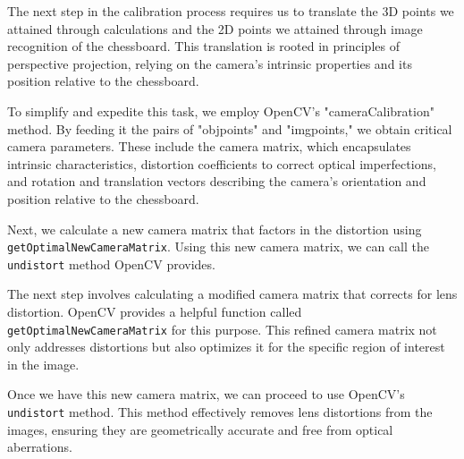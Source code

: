 \documentclass{article}
\def\code#1{\texttt{#1}}
\begin{document}

The next step in the calibration process requires us to translate the 3D points we attained through calculations and the 2D points we attained through image recognition of the chessboard. This translation is rooted in principles of perspective projection, relying on the camera's intrinsic properties and its position relative to the chessboard.

To simplify and expedite this task, we employ OpenCV's "cameraCalibration" method. By feeding it the pairs of "objpoints" and "imgpoints," we obtain critical camera parameters. These include the camera matrix, which encapsulates intrinsic characteristics, distortion coefficients to correct optical imperfections, and rotation and translation vectors describing the camera's orientation and position relative to the chessboard.

Next, we calculate a new camera matrix that factors in the distortion using \code{getOptimalNewCameraMatrix}. Using this new camera matrix, we can call the \code{undistort} method OpenCV provides.

The next step involves calculating a modified camera matrix that corrects for lens distortion. OpenCV provides a helpful function called \code{getOptimalNewCameraMatrix} for this purpose. This refined camera matrix not only addresses distortions but also optimizes it for the specific region of interest in the image.

Once we have this new camera matrix, we can proceed to use OpenCV's \code{undistort} method. This method effectively removes lens distortions from the images, ensuring they are geometrically accurate and free from optical aberrations. 
\end{document}
